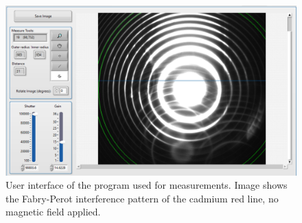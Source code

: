 \documentclass[11pt]{article}
\begin{document}

\begin{figure} 
    \centering
    \includegraphics[width=0.65\linewidth]{d measurement.png}
    \captionsetup{justification=centering}
    \caption{User interface of the program used for measurements. Image shows the Fabry-Perot interference pattern of the cadmium red line, no magnetic field applied.}
    \label{fig: d measurement}
\end{figure}

\end{document}
